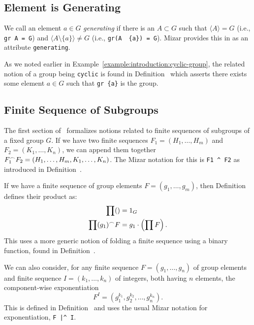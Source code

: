 \subsection{Element is Generating}
We call an element $a\in G$ \emph{generating} if there is an $A\subset G$
such that $\langle A\rangle = G$ (i.e., \texttt{gr A = G}) and
$\langle A\setminus\{a\}\rangle\neq G$ (i.e., \texttt{gr(A \ \{a\}) = G}).
Mizar provides this in  as
an attribute \verb#generating#.

As we noted earlier in Example~\ref{example:introduction:cyclic-group},
the related notion of a group being \lstinline{cyclic} is found in
Definition~
which asserts there exists some element $a\in G$ such that \lstinline!gr {a}!
is the group.

\subsection{Finite Sequence of Subgroups}
The first section of~ formalizes notions related to finite
sequences of subgroups of a fixed group $G$. If we have two finite
sequences $F_{1}=(H_{1},\dots,H_{m})$ and $F_{2}=(K_{1},\dots,K_{n})$,
we can append them together $F_{1}^{\frown} F_{2}=(H_{1},\dots,H_{m},K_{1},\dots,K_{n})$.
The Mizar notation for this is \lstinline{F1 ^ F2} as introduced in
Definition~.

If we have a finite sequence of group elements $F=(g_{1},\dots,g_{m})$,
then Definition~ defines their product as:
\begin{subequations}
  \begin{align}
    \prod () &= 1_{G}\\
    \prod (g_{1})^{\frown} F &= g_{1}\cdot\left(\prod F\right).
  \end{align}
\end{subequations}
This uses a more generic notion of folding a finite sequence using a
binary function, found in Definition~.

We can also consider, for any finite sequence $F=(g_{1},\dots, g_{n})$ of
group elements and finite sequence $I=(k_{1},\dots,k_{n})$ of integers,
both having $n$ elements, the component-wise exponentiation
\begin{equation}
  F^{I} = (g_{1}^{k_{1}}, g_{2}^{k_{2}}, \dots, g_{n}^{k_{n}}).
\end{equation}
This is defined in Definition~ and uses the usual
Mizar notation for exponentiation, \lstinline{F |^ I}.

